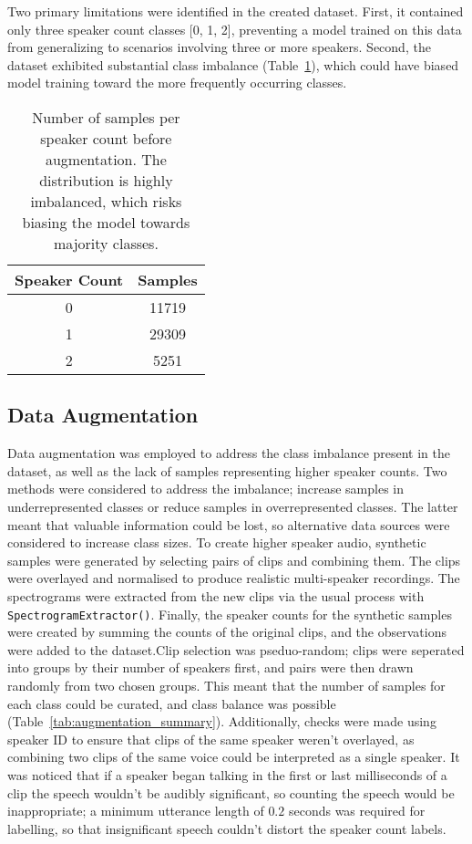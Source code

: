 Two primary limitations were identified in the created dataset. First, it contained only three speaker count classes [0, 1, 2], preventing a model trained on this data from generalizing to scenarios involving three or more speakers. Second, the dataset exhibited substantial class imbalance (Table~\ref{tab:samples_pre_aug}), which could have biased model training toward the more frequently occurring classes.

\begin{table}[H]
  \centering
  \caption{Number of samples per speaker count before augmentation. The distribution is highly imbalanced, which risks biasing the model towards majority classes.}
  \label{tab:samples_pre_aug}
  \begin{tabular}{|c|c|}
    \hline
    \textbf{Speaker Count} & \textbf{Samples} \\
    \hline
    0 & 11719 \\
    \hline
    1 & 29309 \\
    \hline
    2 & 5251 \\
    \hline
  \end{tabular}
\end{table}

\subsection{Data Augmentation}
Data augmentation was employed to address the class imbalance present in the dataset, as well as the lack of samples representing higher speaker counts. Two methods were considered to address the imbalance; increase samples in underrepresented classes or reduce samples in overrepresented classes. The latter meant that valuable information could be lost, so alternative data sources were considered to increase class sizes. To create higher speaker audio, synthetic samples were generated by selecting pairs of clips and combining them. The clips were overlayed and normalised to produce realistic multi-speaker recordings. The spectrograms were extracted from the new clips via the usual process with \lstinline!SpectrogramExtractor()!. Finally, the speaker counts for the synthetic samples were created by summing the counts of the original clips, and the observations were added to the dataset.\newline\newline Clip selection was pseduo-random; clips were seperated into groups by their number of speakers first, and pairs were then drawn randomly from two chosen groups. This meant that the number of samples for each class could be curated, and class balance was possible (Table~\ref{tab:augmentation_summary}). Additionally, checks were made using speaker ID to ensure that clips of the same speaker weren't overlayed, as combining two clips of the same voice could be interpreted as a single speaker. It was noticed that if a speaker began talking in the first or last milliseconds of a clip the speech wouldn't be audibly significant, so counting the speech would be inappropriate; a minimum utterance length of $0.2$ seconds was required for labelling, so that insignificant speech couldn't distort the speaker count labels.

